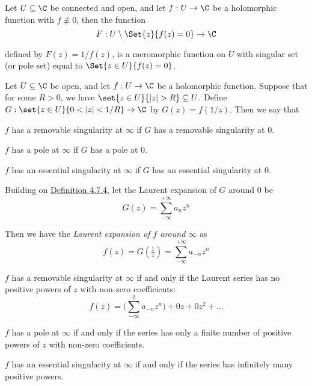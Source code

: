 \label{e672e2a}

Let $U\subseteq\C$ be connected and open, and let $f:U\to\C$ be a holomorphic
function with $f\not\equiv0$, then the function
$$
  F:U\setminus\Set{z}{f(z)=0}\to\C
$$

defined by $F(z)=1/f(z)$, is a meromorphic function on $U$ with singular set
(or pole set) equal to $\Set{z\in U}{f(z)=0}$.

\label{f4cee1f}

Let $U\subseteq\C$ be open, and let $f:U\to\C$ be a holomorphic function.
Suppose that for some $R>0$, we have $\set{z\in U}{|z|>R}\subseteq U$. Define
$G:\set{z\in U}{0<|z|<1/R}\to\C$ by $G(z)=f(1/z)$. Then we say that
\begin{enumerati}
  \item $f$ has a removable singularity at $\infty$ if $G$ has a removable
  singularity at $0$.
  \item $f$ has a pole at $\infty$ if $G$ has a pole at $0$.
  \item $f$ has an essential singularity at $\infty$ if $G$ has an essential
  singularity at $0$.
\end{enumerati}

\label{eb529b9}

Building on \href{f4cee1f}{Definition 4.7.4}, let the Laurent expansion of $G$
around $0$ be
$$
  G(z)=\sum_{-\infty}^{+\infty}a_nz^n
$$

Then we have the \textit{Laurent expansion of $f$ around $\infty$} as
$$
  f(z)=G(\tfrac1z)=\sum_{-\infty}^{+\infty}a_{-n}z^n
$$

\begin{enumerati}
  \item $f$ has a removable singularity at $\infty$ if and only if the Laurent
  series has no positive powers of $z$ with non-zero coefficients:
  $$
    f(z)=\bigg(\sum_{-\infty}^0a_{-n}z^n\bigg)+0z+0z^2+\ldots
  $$

  \item $f$ has a pole at $\infty$ if and only if the series has only a finite
  number of positive powers of $z$ with non-zero coefficients.

  \item $f$ has an essential singularity at $\infty $ if and only if the series
  has infinitely many positive powers.
\end{enumerati}

